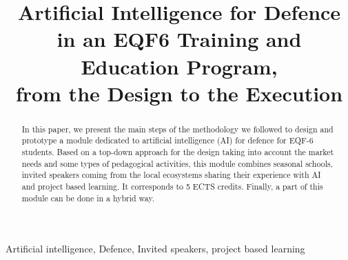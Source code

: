 \documentclass{article}
\title{Artificial Intelligence for Defence \\in an EQF6 Training and Education Program,\\ from the Design to the Execution}
\begin{document}
\maketitle
\begin{abstract}
In this paper, we present the main steps of the methodology we followed to design and prototype a module dedicated to artificial intelligence (AI) for defence for EQF-6 students. Based on a top-down approach for the design taking into account the market needs and some types of pedagogical activities, this module combines seasonal schools, invited speakers coming from the local ecosystems sharing their experience with AI and project based learning. It corresponds to 5 ECTS credits. Finally, a part of this module can be done in a hybrid way. 
\end{abstract}
%
\begin{keywords}
Artificial intelligence, Defence, Invited speakers, project based learning
\end{keywords}
\end{document}
